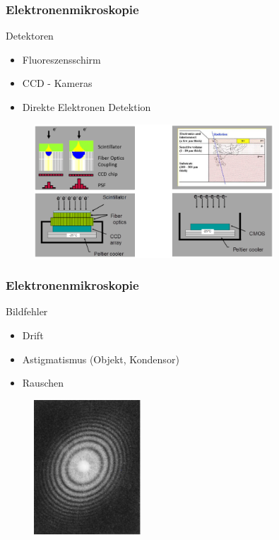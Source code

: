 \begin{frame}
	\frametitle{Elektronenmikroskopie}
	\begin{block}{Detektoren}
		\begin{itemize}
			\item Fluoreszensschirm
			\item CCD - Kameras
			\item Direkte Elektronen Detektion
		\end{itemize}
	\end{block}
	\begin{figure}
		\includegraphics[height = 5cm]{pic/ccd.png}
	\end{figure}
\end{frame}

\begin{frame}
	\frametitle{Elektronenmikroskopie}
	\begin{block}{Bildfehler}
		\begin{itemize}
			\item Drift
			\item Astigmatismus (Objekt, Kondensor)
			\item Rauschen
		\end{itemize}
	\end{block}
	\begin{figure}
		\includegraphics[width = 4cm]{pic/astigmatismus.png}
	\end{figure}
\end{frame}

